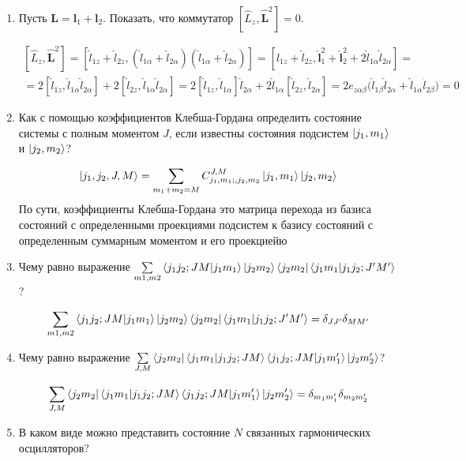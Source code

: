 \documentclass{article}
\begin{document}
\begin{enumerate}
	\item {Пусть $\textbf{L} = \textbf{l}_1 + \textbf{l}_2$. Показать, что коммутатор $[\hat{L}_z,\hat{\textbf{L}}^2] = 0$.}
	
	\begin{equation}
	\begin{split}
		[\hat{L}_z,\hat{\textbf{L}}^2] = [\hat{l}_{1z} + \hat{l}_{2z}, (\hat{l}_{1\alpha} + \hat{l}_{2\alpha})(\hat{l}_{1\alpha} + \hat{l}_{2\alpha})] = [\hat{l}_{1z} + \hat{l}_{2z}, \hat{\textbf{l}}_{1}^2 + \hat{\textbf{l}}_{2}^2 + 2\hat{l}_{1\alpha}\hat{l}_{2\alpha}] = \\
		= 2[ \hat{l}_{1z}, \hat{l}_{1\alpha}\hat{l}_{2\alpha}] + 2[ \hat{l}_{2z}, \hat{l}_{1\alpha}\hat{l}_{2\alpha}] = 2[ \hat{l}_{1z}, \hat{l}_{1\alpha}]\hat{l}_{2\alpha} + 2\hat{l}_{1\alpha}[ \hat{l}_{2z}, \hat{l}_{2\alpha}] = 2 e_{z\alpha\beta} \big( \hat{l}_{1\beta} \hat{l}_{2\alpha} + \hat{l}_{1\alpha} \hat{l}_{2\beta}\big ) = 0
	\end{split}
	\end{equation}
	
	\item {Как с помощью коэффициентов Клебша-Гордана определить состояние системы с полным моментом $J$, если известны состояния подсистем $\ket{j_1, m_1}$ и $\ket{j_2, m_2}$?}
	
	\begin{equation}
		\ket{j_1, j_2, J, M} = \sum\limits_{m_1 + m_2 = M} C^{J, M}_{j_1,m_1;,j_2,m_2} \ket{j_1, m_1}\ket{j_2, m_2}
	\end{equation}
	По сути, коэффициенты Клебша-Гордана это матрица перехода из базиса состояний с определенными проекциями подсистем к базису состояний с определенным суммарным моментом и его проекциейю
	
	\item {Чему равно выражение $\sum\limits_{m1,m2}\braket{j_1 j_2; J M|j_1 m_1} \ket{j_2 m_2} \bra{j_2 m_2} \braket{j_1 m_1|j_1 j_2; J' M'}$?}
	
	\begin{equation}
		\sum\limits_{m1,m2}\braket{j_1 j_2; J M|j_1 m_1} \ket{j_2 m_2} \bra{j_2 m_2} \braket{j_1 m_1|j_1 j_2; J' M'} = \delta_{JJ'}\delta_{MM'}
	\end{equation}
	
	\item {Чему равно выражение $\sum\limits_{J,M} \bra{j_2 m_2} \braket{j_1 m_1|j_1 j_2; J M } \braket{j_1 j_2; J M |j_1 m_1'} \ket{j_2 m_2'}$?}
	
	\begin{equation}
		\sum\limits_{J,M} \bra{j_2 m_2} \braket{j_1 m_1|j_1 j_2; J M } \braket{j_1 j_2; J M |j_1 m_1'} \ket{j_2 m_2'} = \delta_{m_1 m_1'} \delta_{m_2 m_2'}
	\end{equation}
	\item {В каком виде можно представить состояние $N$ связанных гармонических осцилляторов?}
	

\end{enumerate}
\end{document}
